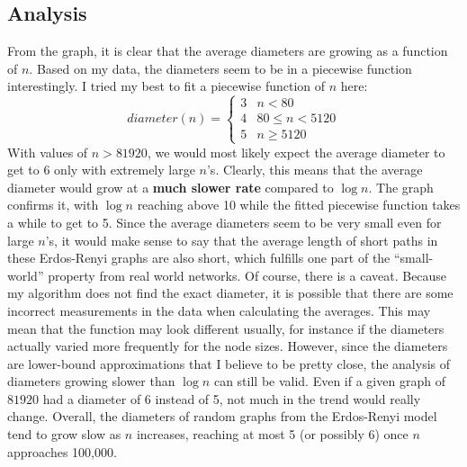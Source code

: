 \documentclass{article}
\begin{document}
\subsection{Analysis}
    From the graph, it is clear that the average diameters are growing as a
    function of $n$. Based on my data, the diameters seem to be in a piecewise 
    function interestingly. I tried my best to fit a piecewise function of $n$ 
    here:
    \begin{equation*}
        diameter(n) = 
        \begin{cases}
            3 & n < 80  \\
            4 & 80 \le n < 5120 \\
            5 & n \ge 5120 
        \end{cases}
    \end{equation*}
    With values of $n > 81920$, we would most likely expect the average diameter
    to get to 6 only with extremely large $n$'s. Clearly, this means that the
    average diameter would grow at a \textbf{much slower rate} compared to 
    $\log{n}$. The graph confirms it, with $\log{n}$ reaching above 10 while the 
    fitted piecewise function takes a while to get to 5. Since the average 
    diameters seem to be very small even for large $n$'s, it would make sense to
    say that the average length of short paths in these Erdos-Renyi graphs are 
    also short, which fulfills one part of the ``small-world'' property from
    real world networks.
    \nextblurb
    Of course, there is a caveat. Because my algorithm does not find the exact
    diameter, it is possible that there are some incorrect measurements in the
    data when calculating the averages. This may mean that the function may look
    different usually, for instance if the diameters actually varied more 
    frequently for the node sizes. However, since the diameters are lower-bound
    approximations that I believe to be pretty close, the analysis of diameters
    growing slower than $\log{n}$ can still be valid. Even if a given graph
    of $81920$ had a diameter of 6 instead of 5, not much in the trend would
    really change. Overall, the diameters of random graphs from the Erdos-Renyi
    model tend to grow slow as $n$ increases, reaching at most 5 (or possibly 6)
    once $n$ approaches 100,000.
\end{document}
